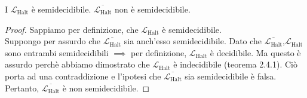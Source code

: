 \documentclass{article}  %
\theoremstyle{definition}
\begin{document}
\begin{theorem}{}
  I $\mathcal{L}_{\text{Halt}}$ è semidecidibile. 
  $\overline{\mathcal{L}_{\text{Halt}}}$ non è semidecidibile.
  \footnotesize %
  \begin{proof}
    Sappiamo per definizione, che $\mathcal{L}_{\text{Halt}}$ è semidecidibile. \\
    Suppongo per assurdo che $\overline{\mathcal{L}_{\text{Halt}}}$ sia anch'esso semidecidibile. Dato che
    $\overline{\mathcal{L}_{\text{Halt}}}$,$\mathcal{L}_{\text{Halt}}$ sono entrambi semidecidibili $\implies$ per
    definizione, $\mathcal{L}_{\text{Halt}}$ è decidibile. Ma questo è assurdo perchè abbiamo dimostrato che 
    $\mathcal{L}_{\text{Halt}}$ è indecidibile (teorema 2.4.1). Ciò porta ad una contraddizione e l'ipotesi che $\overline{\mathcal{L}_{\text{Halt}}}$
    sia semidecidibile è falsa. \\ Pertanto, $\overline{\mathcal{L}_{\text{Halt}}}$ è non semidecidibile. 
  \end{proof}
\end{theorem}
\end{document}
